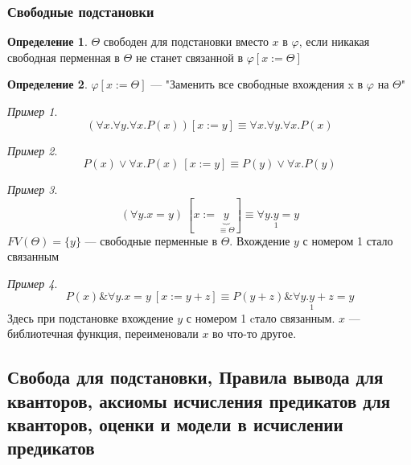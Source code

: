 \documentclass[english]{article}
\theoremstyle{plain}
\theoremstyle{remark}
\newtheorem*{examp}{Пример}
\theoremstyle{definition}
\newtheorem*{definition}{Определение}
\begin{document}
\subsubsection{Свободные подстановки}
\label{sec:orgaf5d3b0}
\begin{definition}
\(\Theta\) свободен для подстановки вместо \(x\) в \(\varphi\), если никакая свободная перменная в \(\Theta\) не станет связанной в \(\varphi[x := \Theta]\)
\end{definition}
\begin{definition}
\(\varphi[x := \Theta]\) --- "Заменить все свободные вхождения x в \(\varphi\) на \(\Theta\)"
\end{definition}
\begin{examp}
\[ (\forall x. \forall y. \forall x. P(x))[x := y] \equiv \forall x. \forall y. \forall x. P(x) \]
\end{examp}
\begin{examp}
\[ P(x) \vee \forall x. P(x)\ [x := y] \equiv P(y) \vee \forall x. P(y) \]
\end{examp}
\begin{examp}
\[ (\forall y. x = y)\ [x := \underbrace{y}_{\equiv \Theta}] \equiv \forall y. \underset{1}{y} = y\]
\(FV(\Theta) = \{y\}\) --- свободные перменные в \(\Theta\). Вхождение \(y\) с номером 1 стало связанным
\end{examp}
\begin{examp}
\[ P(x) \& \forall y. x = y\ [x := y + z] \equiv P(y + z) \& \forall y. \underset{1}{y} + z = y \]
Здесь при подстановке вхождение \(y\) с номером 1 cтало связанным. \(x\) --- библиотечная функция, переименовали \(x\) во что-то другое.
\end{examp}
\subsection{Свобода для подстановки, Правила вывода для кванторов, аксиомы исчисления предикатов для кванторов, оценки и модели в исчислении предикатов}
\label{sec:orgcfcaa34}
\end{document}
